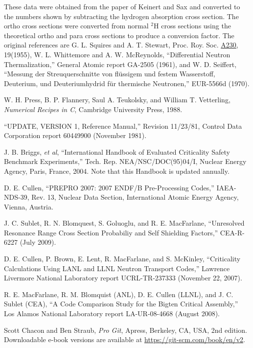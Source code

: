 \documentclass[11pt,twoside]{NJOYMan}
\begin{document}
\begin{thebibliography}{99}
\begin{singlespace}
 These data were obtained from the paper of Keinert
  and Sax\cite{Keinert} and converted to the numbers shown by
  subtracting the hydrogen absorption cross section.  The ortho
  cross sections were converted from normal $^{2}$H cross sections
  using the theoretical ortho and para cross sections to produce
  a conversion factor.  The original references are G. L. Squires
  and A. T. Stewart, Proc. Roy. Soc. \underline{A230}, 19(1955),
  W. L. Whittemore and A. W. McReynolds, ``Differential Neutron
  Thermalization,'' General Atomic report GA-2505 (1961), and
  W. D. Seiffert, ``Messung der Streuquerschnitte von fl\"{u}ssigem
  und festem Wasserstoff, Deuterium, und Deuteriumhydrid f\"{u}r
  thermische Neutronen,'' EUR-5566d (1970).

 W. H. Press, B. P. Flannery, Saul A. Teukolsky,
  and William T. Vetterling, {\it Numerical Recipes in C}, Cambridge
  University Press, 1988.

 ``UPDATE, VERSION 1, Reference Manual,''
  Revision 11/23/81, Control Data Corporation report 60449900
  (November 1981).

 J. B. Briggs, {\it et al}, ``International Handbook
  of Evaluated Criticality Safety Benchmark Experiments,'' Tech. Rep.
  NEA/NSC/DOC(95)04/I, Nuclear Energy Agency, Paris, France, 2004.  Note
  that this Handbook is updated annually.

 D. E. Cullen, ``PREPRO 2007: 2007 ENDF/B Pre-Processing
  Codes,'' IAEA-NDS-39, Rev. 13, Nuclear Data Section, International
  Atomic Energy Agency, Vienna, Austria.

 J. C. Sublet, R. N. Blomquest,
  S. Goluoglu, and R. E. MacFarlane, ``Unresolved Resonance
  Range Cross Section Probabiliy and Self Shielding Factors,''
  CEA-R-6227 (July 2009).

 D. E. Cullen, P. Brown, E. Lent,
  R. MacFarlane, and S. McKinley, ``Criticality Calculations
  Using LANL and LLNL Neutron Transport Codes,'' Lawrence Livermore
  National Laboratory report UCRL-TR-237333 (November 22, 2007).

 R. E. MacFarlane, R. M. Blomquist (ANL),
  D. E. Cullen (LLNL), and J. C. Sublet (CEA),
  ``A Code Comparison Study for the Bigten Critical Assembly,''
  Los Alamos National Laboratory report LA-UR-08-4668 (August 2008).

 Scott Chacon and Ben Straub, {\it Pro Git}, Apress,
  Berkeley, CA, USA, 2nd edition.  Downloadable e-book versions
  are available at \url{https://git-scm.com/book/en/v2}.

\end{singlespace}
\end{thebibliography}

\cleardoublepage

\printindex
\end{document}

